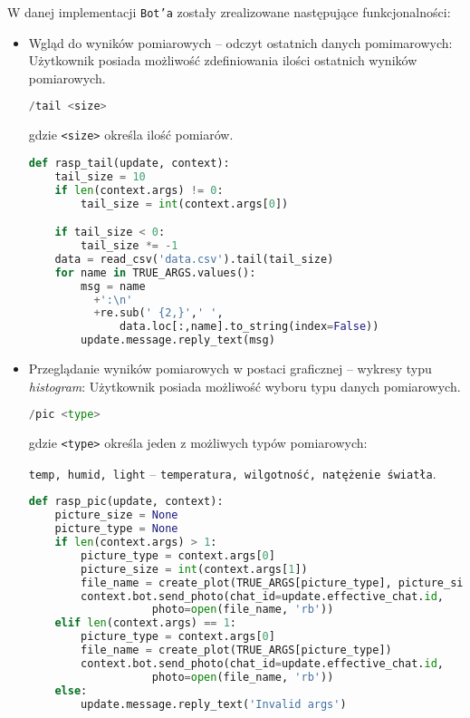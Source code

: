 W danej implementacji \texttt{Bot'a} zostały zrealizowane następujące funkcjonalności:
\begin{itemize}

\item Wgląd do wyników pomiarowych -- odczyt ostatnich danych pomimarowych:
Użytkownik posiada możliwość zdefiniowania ilości ostatnich wyników pomiarowych.
\begin{lstlisting}[frame=single, basicstyle=\ttfamily\small, language=python,
caption={Komedna do pobierania określonej ilości ostatnich wyników pomiarowych}]
/tail <size>
\end{lstlisting}
gdzie \texttt{<size>} określa ilość pomiarów.
\begin{lstlisting}[frame=single, basicstyle=\ttfamily\small, language=python,
caption={Odpowiedź na wprowadzoną komendę -- \texttt{/tail}}]
def rasp_tail(update, context):
    tail_size = 10
    if len(context.args) != 0:
        tail_size = int(context.args[0])

    if tail_size < 0:
        tail_size *= -1
    data = read_csv('data.csv').tail(tail_size)
    for name in TRUE_ARGS.values():
        msg = name
	      +':\n'
	      +re.sub(' {2,}',' ',
		      data.loc[:,name].to_string(index=False))
        update.message.reply_text(msg)

\end{lstlisting}
\newpage

\item Przeglądanie wyników pomiarowych w postaci graficznej -- wykresy typu \textsl{histogram}:
Użytkownik posiada możliwość wyboru typu danych pomiarowych.
\begin{lstlisting}[frame=single, basicstyle=\ttfamily\small, language=python,
caption={Komedna do pobierania wyników określonego typu, w postaci graficznej}]
/pic <type>
\end{lstlisting}
    gdzie \texttt{<type>} określa jeden z możliwych typów pomiarowych: 

    \texttt{temp, humid, light} -- \texttt{temperatura, wilgotność, natężenie światła}.

\begin{lstlisting}[frame=single, basicstyle=\ttfamily\small, language=python,
caption={Odpowiedź na wprowadzoną komendę -- \texttt{/pic}}]
def rasp_pic(update, context):
    picture_size = None
    picture_type = None
    if len(context.args) > 1:
        picture_type = context.args[0]
        picture_size = int(context.args[1])
        file_name = create_plot(TRUE_ARGS[picture_type], picture_size)
        context.bot.send_photo(chat_id=update.effective_chat.id,
			       photo=open(file_name, 'rb'))
    elif len(context.args) == 1:
        picture_type = context.args[0]
        file_name = create_plot(TRUE_ARGS[picture_type])
        context.bot.send_photo(chat_id=update.effective_chat.id,
			       photo=open(file_name, 'rb'))
    else:
        update.message.reply_text('Invalid args')
\end{lstlisting}
\end{itemize}
